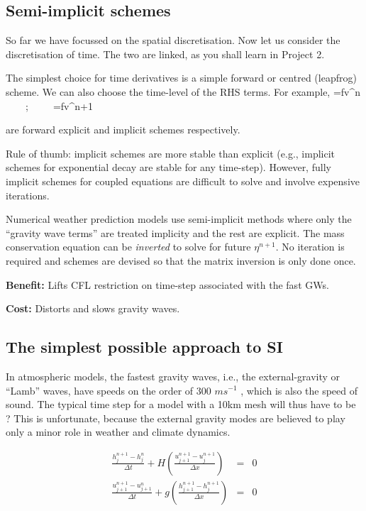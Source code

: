 \subsection{Semi-implicit schemes}

So far we have focussed on the spatial discretisation. Now let us
consider the discretisation of time. The two are linked, as you shall learn in Project 2.

The simplest choice for time derivatives is a simple forward or
centred (leapfrog) scheme. We can also choose the time-level of the RHS terms. For example,
\BEQ
{}=fv^n ~~~~;~~~~~=fv^{n+1}
\EEQ

are forward explicit and implicit schemes respectively.


Rule of thumb: implicit schemes are more stable than explicit
(e.g., implicit schemes for exponential decay are stable for any
time-step). However, fully implicit schemes for coupled equations are
difficult to solve and involve expensive iterations. 


Numerical weather prediction models use semi-implicit methods where
only the ``gravity wave terms'' are treated implicity and the rest are
explicit. The mass conservation equation can be {\em inverted} to
solve for future $\eta^{n+1}$. No iteration is required and schemes
are devised so that the matrix inversion is only done once. 


{\bf Benefit:} Lifts CFL restriction on time-step associated with
the fast GWs.

{\bf Cost:} Distorts and slows gravity waves.


\subsection{The simplest possible approach to SI}

In atmospheric models, the fastest gravity waves, i.e., the external-gravity or “Lamb” waves, have speeds on the order of 300 $m s^{-1}$ , which is also the speed of sound. The typical time step for a model with a 10km mesh will thus have to be \underline{\hspace{1cm}}? This is unfortunate, because the external gravity modes are believed to play only a minor role in weather and climate dynamics. 

\begin{eqnarray}
	 \frac{h_{j}^{n+1} - h_{j}^{n}}{\Delta t}  + H \left(  \frac{u_{j+1}^{n+1} - u_{j}^{n+1}}{\Delta x}  \right)  & = & 0 \\
	 	\frac{u_{j+1}^{n+1} - u_{j+1}^{n}}{\Delta t}  + g \left( \frac{h_{j+1}^{n+1} - h_{j}^{n+1}}{\Delta x}   \right)  & = & 0 
\end{eqnarray}

